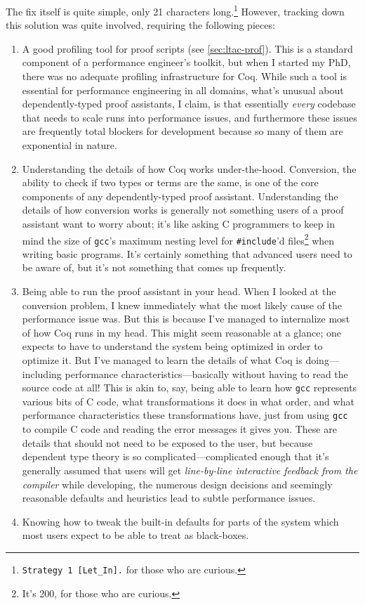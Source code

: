 The fix itself is quite simple, only 21 characters long.\footnote{\texttt{Strategy 1 [Let_In].} for those who are curious.}
However, tracking down this solution was quite involved, requiring the following pieces:
\begin{enumerate}
  \item
    A good profiling tool for proof scripts (see \autoref{sec:ltac-prof}).
    This is a standard component of a performance engineer's toolkit, but when I started my PhD, there was no adequate profiling infrastructure for Coq.
    While such a tool is essential for performance engineering in all domains, what's unusual about dependently-typed proof assistants, I claim, is that essentially \emph{every} codebase that needs to scale runs into performance issues, and furthermore these issues are frequently total blockers for development because so many of them are exponential in nature.
  \item
    Understanding the details of how Coq works under-the-hood.
    Conversion, the ability to check if two types or terms are the same, is one of the core components of any dependently-typed proof assistant.
    Understanding the details of how conversion works is generally not something users of a proof assistant want to worry about; it's like asking C programmers to keep in mind the size of \texttt{gcc}'s maximum nesting level for \texttt{\#include}'d files\footnote{It's 200, for those who are curious.} when writing basic programs.
    It's certainly something that advanced users need to be aware of, but it's not something that comes up frequently.
  \item
    Being able to run the proof assistant in your head.
    When I looked at the conversion problem, I knew immediately what the most likely cause of the performance issue was.
    But this is because I've managed to internalize most of how Coq runs in my head.
    This might seem reasonable at a glance; one expects to have to understand the system being optimized in order to optimize it.
    But I've managed to learn the details of what Coq is doing---including performance characteristics---basically without having to read the source code at all!
    This is akin to, say, being able to learn how \texttt{gcc} represents various bits of C code, what transformations it does in what order, and what performance characteristics these transformations have, just from using \texttt{gcc} to compile C code and reading the error messages it gives you.
    These are details that should not need to be exposed to the user, but because dependent type theory is so complicated---complicated enough that it's generally assumed that users will get \emph{line-by-line interactive feedback from the compiler} while developing, the numerous design decisions and seemingly reasonable defaults and heuristics lead to subtle performance issues.
  \item
    Knowing how to tweak the built-in defaults for parts of the system which most users expect to be able to treat as black-boxes.
\end{enumerate}

